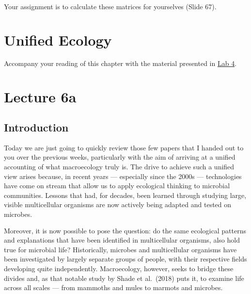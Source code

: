 \documentclass[
  10pt,
]{book}
\begin{document}
Your assignment is to calculate these matrices for yourselves (Slide
67).

\chapter{Unified Ecology}\label{unified-ecology}

\begin{tcolorbox}[enhanced jigsaw, leftrule=.75mm, arc=.35mm, title=\textcolor{quarto-callout-note-color}{\faInfo}\hspace{0.5em}{Also see:}, opacityback=0, colframe=quarto-callout-note-color-frame, toprule=.15mm, bottomtitle=1mm, opacitybacktitle=0.6, titlerule=0mm, colback=white, left=2mm, colbacktitle=quarto-callout-note-color!10!white, toptitle=1mm, rightrule=.15mm, breakable, coltitle=black, bottomrule=.15mm]

Accompany your reading of this chapter with the material presented in
\href{Lab-04-biodiversity}{Lab 4}.

\end{tcolorbox}

\chapter*{Lecture 6a}\label{lecture-6a}

\section{Introduction}\label{introduction-2}

Today we are just going to quickly review those few papers that I handed
out to you over the previous weeks, particularly with the aim of
arriving at a unified accounting of what macroecology truly is. The
drive to achieve such a unified view arises because, in recent years ---
especially since the 2000s --- technologies have come on stream that
allow us to apply ecological thinking to microbial communities. Lessons
that had, for decades, been learned through studying large, visible
multicellular organisms are now actively being adapted and tested on
microbes.

Moreover, it is now possible to pose the question: do the same
ecological patterns and explanations that have been identified in
multicellular organisms, also hold true for microbial life?
Historically, microbes and multicellular organisms have been
investigated by largely separate groups of people, with their respective
fields developing quite independently. Macroecology, however, seeks to
bridge these divides and, as that notable study by Shade et al.~(2018)
puts it, to examine life across all scales --- from mammoths and mules
to marmots and microbes.
\end{document}
